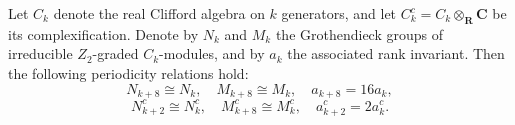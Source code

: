 Let $C_k$ denote the real Clifford algebra on $k$ generators, and let $C_k^c = C_k \otimes_{\mathbf{R}} \mathbf{C}$ be its complexification. Denote by $N_k$ and $M_k$ the Grothendieck groups of irreducible $Z_2$-graded $C_k$-modules, and by $a_k$ the associated rank invariant. Then the following periodicity relations hold:
$$N_{k+8} \cong N_k, \quad M_{k+8} \cong M_k, \quad a_{k+8} = 16 a_k,$$
$$N_{k+2}^c \cong N_k^c, \quad M_{k+8}^c \cong M_k^c, \quad a_{k+2}^c = 2 a_k^c.$$
